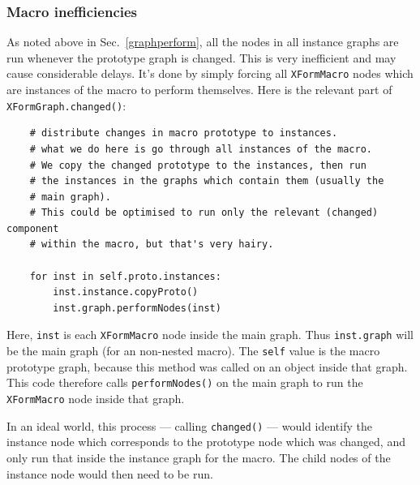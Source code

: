 \subsubsection{Macro inefficiencies}
\label{macroineff}
As noted above in Sec.~\ref{graphperform}, all the nodes in all instance
graphs are run whenever the prototype graph is changed. This is very
inefficient and may cause considerable delays. It's done by simply forcing all
\texttt{XFormMacro} nodes which are instances of the macro to perform themselves. Here
is the relevant part of \texttt{XFormGraph.changed()}:
\begin{lstlisting}
    # distribute changes in macro prototype to instances.
    # what we do here is go through all instances of the macro. 
    # We copy the changed prototype to the instances, then run
    # the instances in the graphs which contain them (usually the
    # main graph).
    # This could be optimised to run only the relevant (changed) component
    # within the macro, but that's very hairy.

    for inst in self.proto.instances:
        inst.instance.copyProto()
        inst.graph.performNodes(inst)
\end{lstlisting}
Here, \texttt{inst} is each \texttt{XFormMacro} node inside the main graph. Thus
\texttt{inst.graph} will be the main graph (for an non-nested macro). The
\texttt{self} value is the macro prototype graph, because this
method was called on an object inside that graph. This code therefore calls
\texttt{performNodes()} on the main graph to run the \texttt{XFormMacro} node inside
that graph. 

In an ideal world, this process --- calling \texttt{changed()} --- would identify
the instance node which corresponds to the prototype node which was changed, and only
run that inside the instance graph for the macro. The child nodes of the instance node
would then need to be run.


